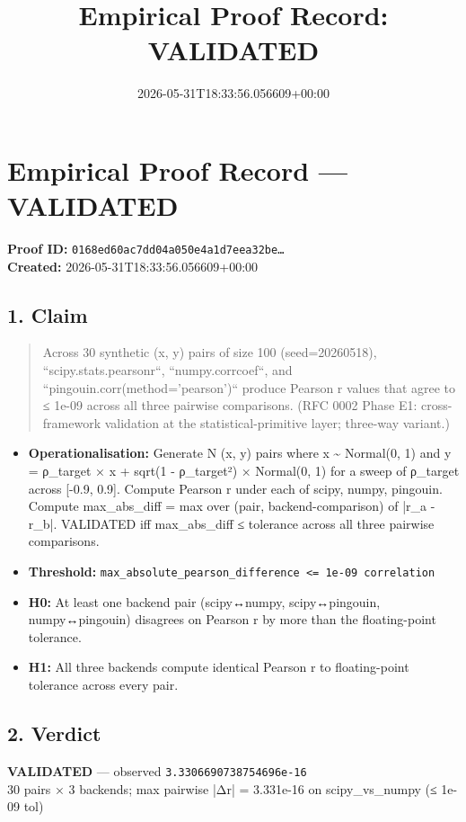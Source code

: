 \documentclass{article}
\title{Empirical Proof Record: VALIDATED}
\date{2026-05-31T18:33:56.056609+00:00}
\begin{document}
\maketitle
\section*{Empirical Proof Record --- \textcolor{validated}{\textbf{VALIDATED}}}
\textbf{Proof ID:} \texttt{0168ed60ac7dd04a050e4a1d7eea32be\dots}\\
\textbf{Created:} 2026-05-31T18:33:56.056609+00:00
\subsection*{1. Claim}
\begin{quote}Across 30 synthetic (x, y) pairs of size 100 (seed=20260518), ``scipy.stats.pearsonr``, ``numpy.corrcoef``, and ``pingouin.corr(method='pearson')`` produce Pearson r values that agree to ≤ 1e-09 across all three pairwise comparisons. (RFC 0002 Phase E1: cross-framework validation at the statistical-primitive layer; three-way variant.)\end{quote}
\begin{itemize}
\item \textbf{Operationalisation:} Generate N (x, y) pairs where x \textasciitilde{} Normal(0, 1) and y = ρ\_target × x + sqrt(1 - ρ\_target²) × Normal(0, 1) for a sweep of ρ\_target across [-0.9, 0.9]. Compute Pearson r under each of scipy, numpy, pingouin. Compute max\_abs\_diff = max over (pair, backend-comparison) of |r\_a - r\_b|. VALIDATED iff max\_abs\_diff ≤ tolerance across all three pairwise comparisons.
\item \textbf{Threshold:} \texttt{max\_absolute\_pearson\_difference <= 1e-09 correlation}
\item \textbf{H0:} At least one backend pair (scipy↔numpy, scipy↔pingouin, numpy↔pingouin) disagrees on Pearson r by more than the floating-point tolerance.
\item \textbf{H1:} All three backends compute identical Pearson r to floating-point tolerance across every pair.
\end{itemize}
\subsection*{2. Verdict}
\textcolor{validated}{\textbf{VALIDATED}} --- observed \texttt{3.3306690738754696e-16}\\
30 pairs × 3 backends; max pairwise |Δr| = 3.331e-16 on scipy\_vs\_numpy (≤ 1e-09 tol)
\end{document}
